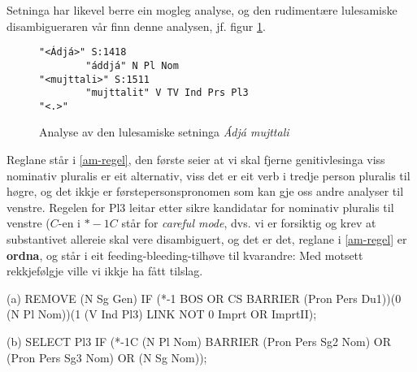 \documentclass[a4paper,norsk]{article}
\begin{document}
Setninga har likevel berre ein mogleg analyse, og den rudimentære lulesamiske disambigueraren vår finn denne analysen, jf. figur \ref{am}. %

\begin{figure}[htbp]
\begin{center}
\begin{verbatim}
"<Ádjá>" S:1418
        "áddjá" N Pl Nom
"<mujttali>" S:1511
        "mujttalit" V TV Ind Prs Pl3
"<.>"
\end{verbatim}
\caption{Analyse av den lulesamiske setninga \textit{Ádjá mujttali}}
\label{am}
\end{center}
\end{figure}

Reglane står i \ref{am-regel}, den første seier at vi skal fjerne genitivlesinga viss nominativ pluralis er eit alternativ, viss det er eit verb i tredje person pluralis til høgre, og det ikkje er førstepersonspronomen som kan gje  oss andre analyser til venstre. Regelen for Pl3 leitar etter sikre kandidatar for nominativ pluralis til venstre ($C$-en i $*-1C$ står for \textit{careful mode}, dvs. vi er forsiktig og krev at substantivet allereie skal vere disambiguert, og det er det, reglane i \ref{am-regel} er \textbf{ordna}, og står i eit feeding-bleeding-tilhøve til kvarandre: Med motsett rekkjefølgje ville vi ikkje ha fått tilslag. %

\begin{example}\label{am-regel}
\item[(a)] REMOVE (N Sg Gen) IF (*-1 BOS OR CS BARRIER (Pron Pers Du1))(0 (N Pl Nom))(1 (V Ind Pl3) LINK NOT 0 Imprt OR ImprtII);
\item[(b)] SELECT Pl3 IF (*-1C (N Pl Nom) BARRIER (Pron Pers Sg2 Nom) OR  (Pron Pers Sg3 Nom) OR (N Sg Nom));
\end{example}
\end{document}
